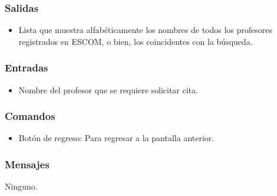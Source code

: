 
\subsubsection{Salidas}
	\begin{itemize}
		\item Lista que muestra alfabéticamente los nombres de todos los profesores registrados en ESCOM, o bien, los coincidentes con la búsqueda. 
	\end{itemize}

\subsubsection{Entradas}

\begin{itemize}
		\item Nombre del profesor que se requiere solicitar cita.  
	\end{itemize}

\subsubsection{Comandos}
\begin{itemize}
		\item Botón de regreso: Para regresar a la pantalla anterior. 
	\end{itemize}

\subsubsection{Mensajes}
Ninguno.

